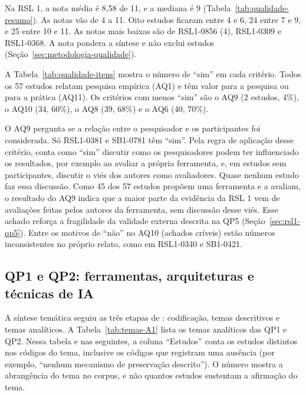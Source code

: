 Na RSL 1, a nota média é 8,58 de 11, e a mediana é 9
(Tabela~\ref{tab:qualidade-resumo}). As notas vão de 4 a 11. Oito estudos
ficaram entre 4 e 6, 24 entre 7 e 9, e 25 entre 10 e 11. As notas mais baixas
são de RSL1-0856 (4), RSL1-0309 e RSL1-0368. A nota pondera a síntese e não
exclui estudos (Seção~\ref{sec:metodologia-qualidade}).

A Tabela~\ref{tab:qualidade-itens} mostra o número de ``sim'' em cada
critério. Todos os 57 estudos relatam pesquisa empírica (AQ1) e têm valor
para a pesquisa ou para a prática (AQ11). Os critérios com menos ``sim'' são
o AQ9 (2 estudos, 4\%), o AQ10 (34, 60\%), o AQ8 (39, 68\%) e o AQ6 (40,
70\%).

O AQ9 pergunta se a relação entre o pesquisador e os participantes foi
considerada. Só RSL1-0381 e SB1-0781 têm ``sim''. Pela regra de aplicação
desse critério, conta como ``sim'' discutir como os pesquisadores podem ter
influenciado os resultados, por exemplo ao avaliar a própria ferramenta, e,
em estudos sem participantes, discutir o viés dos autores como avaliadores.
Quase nenhum estudo faz essa discussão. Como 45 dos 57 estudos propõem uma
ferramenta e a avaliam, o resultado do AQ9 indica que a maior parte da
evidência da RSL 1 vem de avaliações feitas pelos autores da ferramenta, sem
discussão desse viés. Esse achado reforça a fragilidade da
validade externa descrita na QP5 (Seção~\ref{sec:rsl1-qp5}). Entre os
motivos de ``não'' no AQ10 (achados críveis) estão números inconsistentes no
próprio relato, como em RSL1-0340 e SB1-0421.

\subsection{QP1 e QP2: ferramentas, arquiteturas e técnicas de IA}
\label{sec:rsl1-qp1-qp2}

A síntese temática seguiu as três etapas de :
codificação, temas descritivos e temas analíticos. A
Tabela~\ref{tab:temas-A1} lista os temas analíticos das QP1 e QP2. Nessa
tabela e nas seguintes, a coluna ``Estudos'' conta os estudos distintos nos
códigos do tema, inclusive os códigos que registram uma ausência (por
exemplo, ``nenhum mecanismo de preservação descrito''). O número mostra a
abrangência do tema no corpus, e não quantos estudos sustentam a afirmação do
tema.

